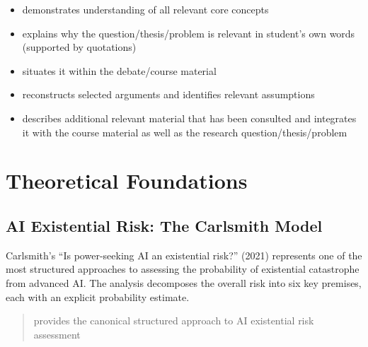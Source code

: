 \documentclass[
  11pt,
  letterpaper,
]{book}
\providecommand{\tightlist}{%
  \setlength{\itemsep}{0pt}\setlength{\parskip}{0pt}}
\begin{document}
\begin{tcolorbox}[enhanced jigsaw, coltitle=black, opacitybacktitle=0.6, titlerule=0mm, colframe=quarto-callout-note-color-frame, breakable, leftrule=.75mm, colback=white, left=2mm, opacityback=0, colbacktitle=quarto-callout-note-color!10!white, bottomtitle=1mm, toptitle=1mm, title=\textcolor{quarto-callout-note-color}{\faInfo}\hspace{0.5em}{20\% of Grade: \textasciitilde{} 29\% of text \textasciitilde{} 8700
words \textasciitilde{} 20 pages}, arc=.35mm, bottomrule=.15mm, rightrule=.15mm, toprule=.15mm]

\begin{itemize}
\tightlist
\item
  demonstrates understanding of all relevant core concepts
\item
  explains why the question/thesis/problem is relevant in student's own
  words (supported by quotations)
\item
  situates it within the debate/course material
\item
  reconstructs selected arguments and identifies relevant assumptions
\item
  describes additional relevant material that has been consulted and
  integrates it with the course material as well as the research
  question/thesis/problem
\end{itemize}

\end{tcolorbox}

\section{Theoretical Foundations}\label{sec-theoretical-foundations}

\subsection{AI Existential Risk: The Carlsmith
Model}\label{sec-carlsmith-model}

Carlsmith's ``Is power-seeking AI an existential risk?'' (2021)
represents one of the most structured approaches to assessing the
probability of existential catastrophe from advanced AI. The analysis
decomposes the overall risk into six key premises, each with an explicit
probability estimate.

\begin{quote}
\textcite{carlsmith2021} provides the canonical structured approach to
AI existential risk assessment
\end{quote}
\end{document}
